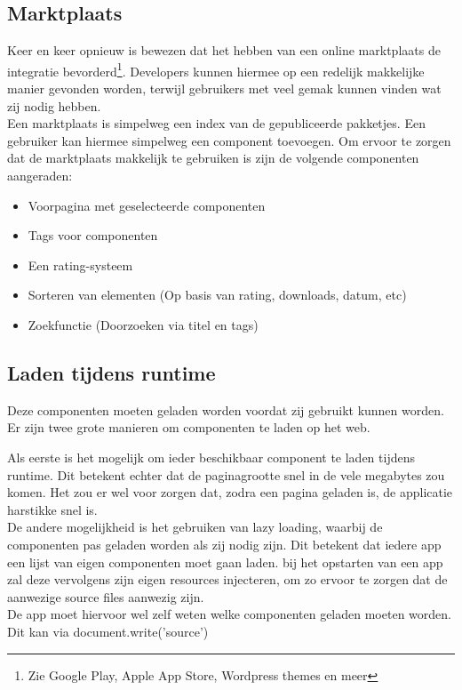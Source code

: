 \subsection{Marktplaats}

Keer en keer opnieuw is bewezen dat het hebben van een online marktplaats de integratie bevorderd\footnote{Zie Google Play, Apple App Store, Wordpress themes en meer}. Developers kunnen hiermee op een redelijk makkelijke manier gevonden worden, terwijl gebruikers met veel gemak kunnen vinden wat zij nodig hebben. \\

Een marktplaats is simpelweg een index van de gepubliceerde pakketjes. Een gebruiker kan hiermee simpelweg een component toevoegen. Om ervoor te zorgen dat de marktplaats makkelijk te gebruiken is zijn de volgende componenten aangeraden:

\begin{itemize}
	\item Voorpagina met geselecteerde componenten
	\item Tags voor componenten
	\item Een rating-systeem 
	\item Sorteren van elementen (Op basis van rating, downloads, datum, etc)
	\item Zoekfunctie (Doorzoeken via titel en tags)
\end{itemize}

\subsection{Laden tijdens runtime}

Deze componenten moeten geladen worden voordat zij gebruikt kunnen worden. Er zijn twee grote manieren om componenten te laden op het web.

Als eerste is het mogelijk om ieder beschikbaar component te laden tijdens runtime. Dit betekent echter dat de paginagrootte snel in de vele megabytes zou komen. Het zou er wel voor zorgen dat, zodra een pagina geladen is, de applicatie harstikke snel is. \\ 

De andere mogelijkheid is het gebruiken van lazy loading, waarbij de componenten pas geladen worden als zij nodig zijn. Dit betekent dat iedere app een lijst van eigen componenten moet gaan laden. bij het opstarten van een app zal deze vervolgens zijn eigen resources injecteren, om zo ervoor te zorgen dat de aanwezige source files aanwezig zijn. \\

De app moet hiervoor wel zelf weten welke componenten geladen moeten worden. Dit kan via document.write('source')